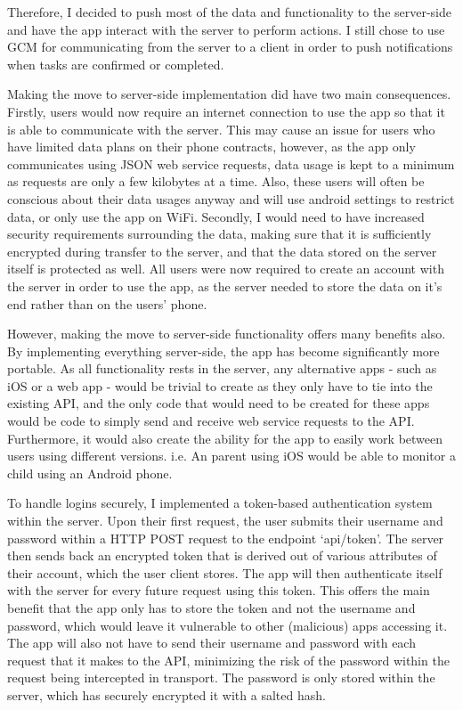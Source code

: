 Therefore, I decided to push most of the data and functionality to the server-side and have the app interact with the server to perform actions.
I still chose to use GCM for communicating from the server to a client in order to push notifications when tasks are confirmed or completed.

Making the move to server-side implementation did have two main consequences. 
Firstly, users would now require an internet connection to use the app so that it is able to communicate with the server.
This may cause an issue for users who have limited data plans on their phone contracts, however, as the app only communicates using JSON web service requests, data usage is kept to a minimum as requests are only a few kilobytes at a time.
Also, these users will often be conscious about their data usages anyway and will use android settings to restrict data, or only use the app on WiFi. 
Secondly, I would need to have increased security requirements surrounding the data, making sure that it is sufficiently encrypted during transfer to the server, and that the data stored on the server itself is protected as well.
All users were now required to create an account with the server in order to use the app, as the server needed to store the data on it's end rather than on the users' phone.

However, making the move to server-side functionality offers many benefits also.
By implementing everything server-side, the app has become significantly more portable. 
As all functionality rests in the server, any alternative apps - such as iOS or a web app - would be trivial to create as they only have to tie into the existing API, and the only code that would need to be created for these apps would be code to simply send and receive web service requests to the API.
Furthermore, it would also create the ability for the app to easily work between users using different versions. 
i.e. An parent using iOS would be able to monitor a child using an Android phone.

To handle logins securely, I implemented a token-based authentication system within the server. 
Upon their first request, the user submits their username and password within a HTTP POST request to the endpoint `api/token'.
The server then sends back an encrypted token that is derived out of various attributes of their account, which the user client stores.
The app will then authenticate itself with the server for every future request using this token.
This offers the main benefit that the app only has to store the token and not the username and password, which would leave it vulnerable to other (malicious) apps accessing it.
The app will also not have to send their username and password with each request that it makes to the API, minimizing the risk of the password within the request being intercepted in transport.
The password is only stored within the server, which has securely encrypted it with a salted hash.


